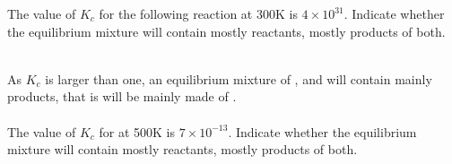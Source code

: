 \documentclass[main.tex]{subfiles}
\begin{document}
\begin{description}
\begin{example} %
The value of $K_{c}$ for the following reaction at 300K is $4\times 10^{31}$. Indicate whether the equilibrium mixture will contain mostly reactants, mostly products of both.
\begin{center}\end{center}
\\
As $K_{c}$ is larger than one, an equilibrium mixture of ,   and   will contain mainly products, that is will be mainly made of .
\\
\faDiamond\ \\
The value of $K_{c}$ for  at 500K is $7\times 10^{-13}$. Indicate whether the equilibrium mixture will contain mostly reactants, mostly products of both.
\\
\end{example}%
\begin{marginfigure}[-0cm]%

\end{marginfigure}
\end{description}
\end{document}

